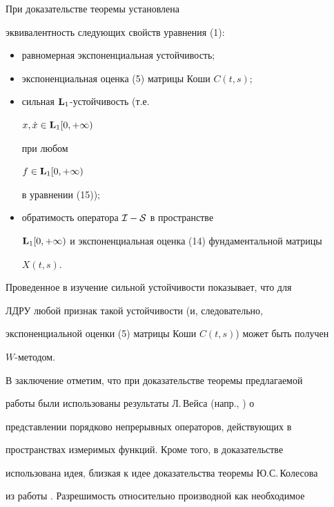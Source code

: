 \begin{notenonum} При доказательстве теоремы установлена


эквивалентность следующих свойств уравнения (1):


\begin{itemize}


\item[1)] равномерная экспоненциальная устойчивость;


\item[2)] экспоненциальная оценка (5) матрицы Коши $C(t,s)$;


\item[3)] сильная $\bold L_1$-устойчивость (т.е. 


$x,\Dot x\in\bold L_1[0,+\infty)$


при любом


$f\in\bold L_1[0,+\infty)$


в уравнении (15));


\item[4)] обратимость оператора ${\cal I-S}$ в пространстве 


$\bold L_1[0,+\infty)$ и экспоненциальная оценка (14) фундаментальной матрицы


$X(t,s)$.


\end{itemize}


\end{notenonum}





Проведенное в \cite{Az2} изучение сильной устойчивости показывает, что для


ЛДРУ любой признак такой устойчивости (и, следовательно,


экспоненциальной оценки (5) матрицы Коши $C(t,s)$) может быть получен


$W$-методом.





В заключение отметим, что при доказательстве теоремы предлагаемой


работы были использованы результаты Л.\,Вейса (напр., \cite{Weis}) о


представлении порядково непрерывных операторов, действующих в


пространствах измеримых функций. Кроме того, в доказательстве


использована идея, близкая к идее доказательства теоремы Ю.С.\,Колесова


из работы \cite{Kol1}. Разрешимость относительно производной как необходимое


